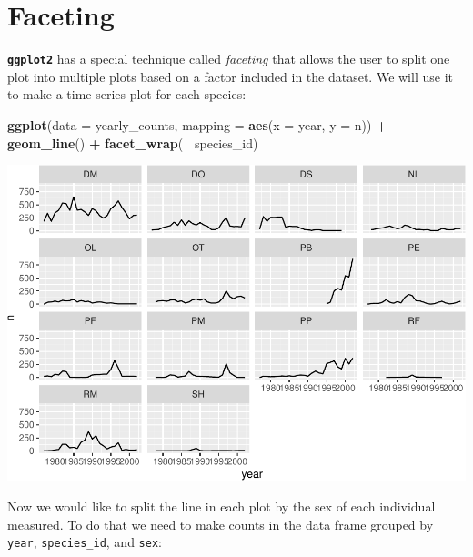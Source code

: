 \documentclass[]{book}
\newenvironment{Shaded}{\begin{snugshade}}{\end{snugshade}}
\newcommand{\KeywordTok}[1]{\textcolor[rgb]{0.13,0.29,0.53}{\textbf{#1}}}
\newcommand{\DataTypeTok}[1]{\textcolor[rgb]{0.13,0.29,0.53}{#1}}
\newcommand{\StringTok}[1]{\textcolor[rgb]{0.31,0.60,0.02}{#1}}
\newcommand{\OperatorTok}[1]{\textcolor[rgb]{0.81,0.36,0.00}{\textbf{#1}}}
\newcommand{\NormalTok}[1]{#1}
\begin{document}
\section{Faceting}\label{faceting}

\textbf{\texttt{ggplot2}} has a special technique called \emph{faceting}
that allows the user to split one plot into multiple plots based on a
factor included in the dataset. We will use it to make a time series
plot for each species:

\begin{Shaded}
\begin{Highlighting}[]
\KeywordTok{ggplot}\NormalTok{(}\DataTypeTok{data =}\NormalTok{ yearly_counts, }\DataTypeTok{mapping =} \KeywordTok{aes}\NormalTok{(}\DataTypeTok{x =}\NormalTok{ year, }\DataTypeTok{y =}\NormalTok{ n)) }\OperatorTok{+}
\StringTok{    }\KeywordTok{geom_line}\NormalTok{() }\OperatorTok{+}
\StringTok{    }\KeywordTok{facet_wrap}\NormalTok{(}\OperatorTok{~}\StringTok{ }\NormalTok{species_id)}
\end{Highlighting}
\end{Shaded}

\includegraphics{img/R-ecology-first-facet-1.pdf}

Now we would like to split the line in each plot by the sex of each
individual measured. To do that we need to make counts in the data frame
grouped by \texttt{year}, \texttt{species\_id}, and \texttt{sex}:

\begin{Shaded}
\end{Shaded}
\end{document}
